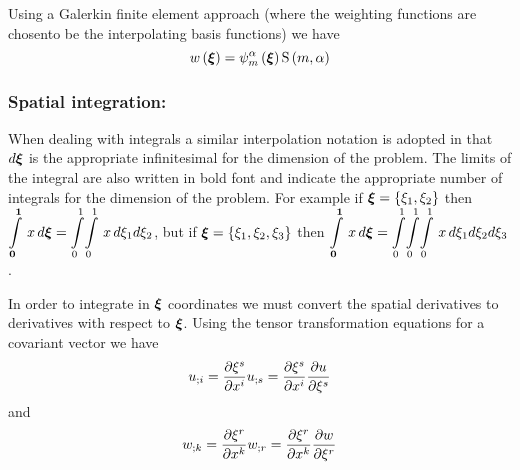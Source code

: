 Using a Galerkin finite element approach (where the weighting functions are
chosento be the interpolating basis functions) we have 
\begin{equation}
  \fnof{w}{\vect{\xi}}=\gbfn{m}{\alpha}{\vect{\xi}}\gsf{m}{\alpha}
\end{equation}

\subsubsection{Spatial integration:}

When dealing with integrals a similar interpolation notation is adopted in
that $d\vect{\xi}$ is the appropriate infinitesimal for the dimension of the
problem. The limits of the integral are also written in bold font and indicate
the appropriate number of integrals for the dimension of the problem.  For
example if $\vect{\xi}=\bbrac{\xione,\xitwo}$ then
$\gint{\vect{0}}{\vect{1}}{x}
{\vect{\xi}}=\giint{0}{1}{0}{1}{x}{\xione}{\xitwo}$,
but if $\vect{\xi}=\bbrac{\xione,\xitwo,\xithree}$ then 
$\gint{\vect{0}}{\vect{1}}{x}{\vect{\xi}}=
\dintl{0}{1}\!\dintl{0}{1}\!\dintl{0}{1}\,x\,d\xione d\xitwo d\xithree$.

In order to integrate in $\vect{\xi}$ coordinates we must convert the spatial
derivatives to derivatives with respect to $\vect{\xi}$. Using the tensor
transformation equations for a covariant vector we have
\begin{equation}  
   {u}_{;i} = \dfrac{\partial \xi^{s}}{\partial x^{i}}  {u}_{;s} =
   \dfrac{\partial \xi^{s}}{\partial x^{i}}  \dfrac{\partial u}{\partial \xi^{s}} 
\end{equation}
and 
\begin{equation}
   {w}_{;k} = \dfrac{\partial \xi^{r}}{\partial x^{k}}  {w}_{;r} =
   \dfrac{\partial \xi^{r}}{\partial x^{k}}  \dfrac{\partial w}{\partial \xi^{r}} 
\end{equation}

